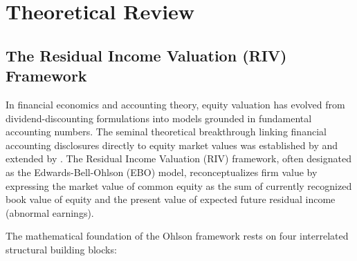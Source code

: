 \section{Theoretical Review}
\label{sec:theoretical_review}

\subsection{The Residual Income Valuation (RIV) Framework}
\label{subsec:ohlson_framework}

In financial economics and accounting theory, equity valuation has evolved from dividend-discounting formulations into models grounded in fundamental accounting numbers. The seminal theoretical breakthrough linking financial accounting disclosures directly to equity market values was established by \citet{ohlson1995} and extended by \citet{feltham1995}. The Residual Income Valuation (RIV) framework, often designated as the Edwards-Bell-Ohlson (EBO) model, reconceptualizes firm value by expressing the market value of common equity as the sum of currently recognized book value of equity and the present value of expected future residual income (abnormal earnings).

The mathematical foundation of the Ohlson framework rests on four interrelated structural building blocks:

